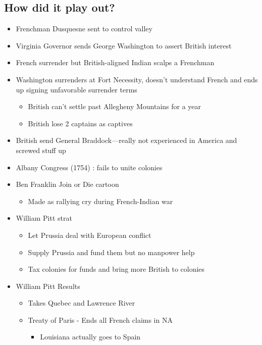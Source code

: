 \documentclass[letterpaper]{article}
\begin{document}
\subsection{How did it play out?}
\label{sec:org438df08}
\begin{itemize}
\item Frenchman Dusquesne sent to control valley
\item Virginia Governor sends George Washington to assert British interest
\item French surrender but British-aligned Indian scalps a Frenchman
\item Washington surrenders at Fort Necessity, doesn't understand French and ends up signing unfavorable surrender terms
\begin{itemize}
\item British can't settle past Allegheny Mountains for a year
\item British lose 2 captains as captives
\end{itemize}
\item British send General Braddock—really not experienced in America and screwed stuff up
\item Albany Congress (1754) : fails to unite colonies
\item Ben Franklin Join or Die cartoon
\begin{itemize}
\item Made as rallying cry during French-Indian war
\end{itemize}
\item William Pitt strat
\begin{itemize}
\item Let Prussia deal with European conflict
\item Supply Prussia and fund them but no manpower help
\item Tax colonies for funds and bring more British to colonies
\end{itemize}
\item William Pitt Results
\begin{itemize}
\item Takes Quebec and Lawrence River
\item Treaty of Paris - Ends all French claims in NA
\begin{itemize}
\item Louisiana actually goes to Spain
\end{itemize}
\end{itemize}
\end{itemize}
\end{document}

